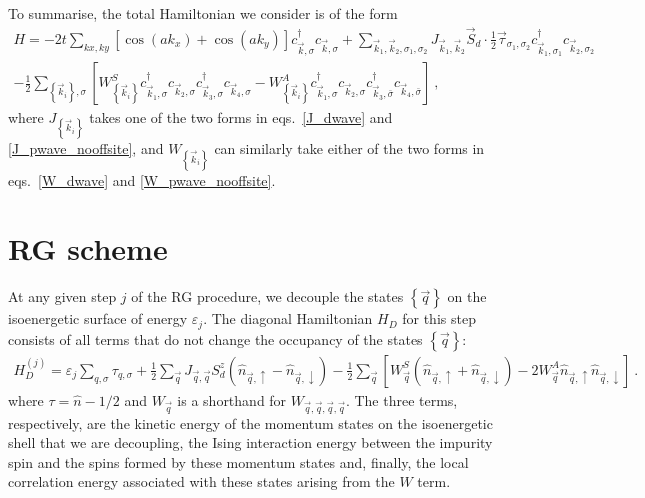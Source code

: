 \documentclass{revtex4-2}
\begin{document}
To summarise, the total Hamiltonian we consider is of the form
\begin{equation}\begin{aligned}\label{hamiltonian}
	H = -2t\sum_{kx,k y}\left[\cos(ak_x) + \cos(ak_y)\right] c^\dagger_{\vec k,\sigma}c_{\vec k,\sigma} + \sum_{\vec k_1, \vec k_2, \sigma_1, \sigma_2} J_{\vec k_1, \vec k_2} \vec{S}_d\cdot\frac{1}{2}\vec{\tau}_{\sigma_1,\sigma_2} c^\dagger_{\vec k_1,\sigma_1}c_{\vec k_2,\sigma_2} \\
	-\frac{1}{2}\sum_{\left\{ \vec k_i \right\},\sigma}\left[W^S_{\left\{\vec k_i\right\}} c^\dagger_{\vec k_1,\sigma}c_{\vec k_2,\sigma}c^\dagger_{\vec k_3,\sigma}c_{\vec k_4,\sigma} - W^A_{\left\{\vec k_i\right\}} c^\dagger_{\vec k_1,\sigma}c_{\vec k_2,\sigma}c^\dagger_{\vec k_3,\bar\sigma}c_{\vec k_4,\bar\sigma}\right]~,
\end{aligned}\end{equation}
where \(J_{\left\{ \vec k_i \right\} }\) takes one of the two forms in eqs.~\ref{J_dwave} and \ref{J_pwave_nooffsite}, and \(W_{\left\{\vec k_i\right\}}\) can similarly take either of the two forms in eqs.~\ref{W_dwave} and \ref{W_pwave_nooffsite}. 

\section{RG scheme}
At any given step \(j\) of the RG procedure, we decouple the states \(\left\{ \vec q \right\} \) on the isoenergetic surface of energy \(\varepsilon_j\). The diagonal Hamiltonian \(H_D\) for this step consists of all terms that do not change the occupancy of the states \(\left\{\vec q\right\}\):
\begin{equation}\begin{aligned}
	H_D^{(j)} = \varepsilon_j\sum_{q,\sigma}\tau_{q,\sigma} + \frac{1}{2}\sum_{\vec q}J_{\vec q, \vec q}S_d^z\left(\hat n_{\vec q, \uparrow} - \hat n_{\vec q, \downarrow}\right) - \frac{1}{2}\sum_{\vec q}\left[W^S_{\vec q}\left(\hat n_{\vec q, \uparrow} + \hat n_{\vec q, \downarrow}\right) - 2W^A_{\vec q}\hat n_{\vec q, \uparrow}\hat n_{\vec q, \downarrow}\right]~.
\end{aligned}\end{equation}
where \(\tau = \hat n - 1/2\) and \(W_{\vec q}\) is a shorthand for \(W_{\vec q,\vec q,\vec q,\vec q}\). The three terms, respectively, are the kinetic energy of the momentum states on the isoenergetic shell that we are decoupling, the Ising interaction energy between the impurity spin and the spins formed by these momentum states and, finally, the local correlation energy associated with these states arising from the \(W\) term.
\end{document}
